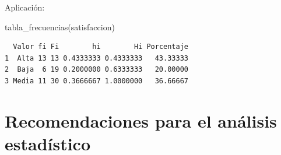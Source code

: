 \documentclass[
  spanish,
  14pt,
  letterpaper,
  DIV=11,
  numbers=noendperiod]{scrartcl}
\newenvironment{Shaded}{\begin{snugshade}}{\end{snugshade}}
\newcommand{\AttributeTok}[1]{\textcolor[rgb]{0.98,0.15,0.45}{#1}}
\newcommand{\ControlFlowTok}[1]{\textcolor[rgb]{0.98,0.15,0.45}{#1}}
\newcommand{\DecValTok}[1]{\textcolor[rgb]{0.68,0.51,1.00}{#1}}
\newcommand{\FunctionTok}[1]{\textcolor[rgb]{0.65,0.89,0.18}{#1}}
\newcommand{\NormalTok}[1]{\textcolor[rgb]{0.97,0.97,0.95}{#1}}
\newcommand{\OtherTok}[1]{\textcolor[rgb]{0.65,0.89,0.18}{#1}}
\newcommand{\SpecialCharTok}[1]{\textcolor[rgb]{0.68,0.51,1.00}{#1}}
\begin{document}
\begin{Shaded}
\end{Shaded}

Aplicación:

\begin{Shaded}
\begin{Highlighting}[]
\FunctionTok{tabla\_frecuencias}\NormalTok{(satisfaccion)}
\end{Highlighting}
\end{Shaded}

\begin{verbatim}
  Valor fi Fi        hi        Hi Porcentaje
1  Alta 13 13 0.4333333 0.4333333   43.33333
2  Baja  6 19 0.2000000 0.6333333   20.00000
3 Media 11 30 0.3666667 1.0000000   36.66667
\end{verbatim}

\section{Recomendaciones para el análisis
estadístico}\label{recomendaciones-para-el-anuxe1lisis-estaduxedstico}
\end{document}
